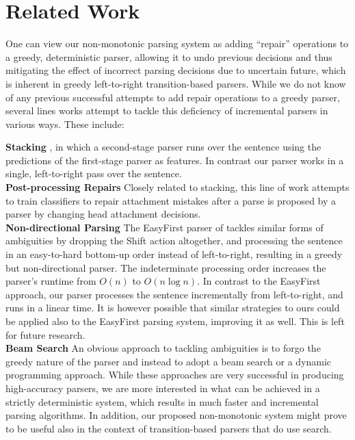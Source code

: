 \documentclass[11pt,letterpaper]{article}
\begin{document}
\section{Related Work}

One can view our non-monotonic parsing system as adding ``repair'' operations to a greedy, deterministic parser, allowing it to undo previous decisions and thus mitigating the effect of incorrect parsing decisions due to uncertain future, which is inherent in greedy left-to-right transition-based parsers. 
While we do not know of any previous successful attempts to add repair operations to a greedy parser, several lines works attempt to tackle this deficiency of incremental parsers in various ways. These include:

\noindent\textbf{Stacking} \citep{nivre-mcdonald-stacking,torresmartins:08:stacking}, in which a second-stage parser runs over the sentence using the predictions of the first-stage parser as features. In contrast our parser works in a single, left-to-right pass over the sentence.\\
\noindent\textbf{Post-processing Repairs} \citep{attardi:07,hall05iwpt}
Closely related to stacking, this line of work attempts to train classifiers
to repair attachment mistakes after a parse is proposed by a parser by
changing head attachment decisions.\\
\noindent\textbf{Non-directional Parsing} 
The EasyFirst parser of \citet{goldberg10}
tackles similar forms of
ambiguities by dropping the Shift action altogether, and processing the
sentence in an easy-to-hard bottom-up order instead of left-to-right,
resulting in a greedy but non-directional parser.  The indeterminate
processing order increases the parser's runtime from $O(n)$ to $O(n\log{}n)$.
In contrast to the EasyFirst approach, our parser processes the sentence
incrementally from left-to-right, and runs in a linear time.  It is however
possible that similar strategies to ours could be applied also to the
EasyFirst parsing system, improving it as well. This is left for future
research.\\
\noindent\textbf{Beam Search} An obvious approach to tackling
ambiguities is to forgo the greedy nature of the parser and instead to adopt a
beam search \citep{zhang:08,zhang:11} or a dynamic programming \citep{huang:10,kuhlmann:11}
approach. While these approaches are very successful in producing
high-accuracy parsers, we are more interested in what can be achieved in a
strictly deterministic system, which results in much faster and incremental
parsing algorithms.  In addition, our proposed non-monotonic system might
prove to be useful also in the context of transition-based parsers that do use
search.
\end{document}
